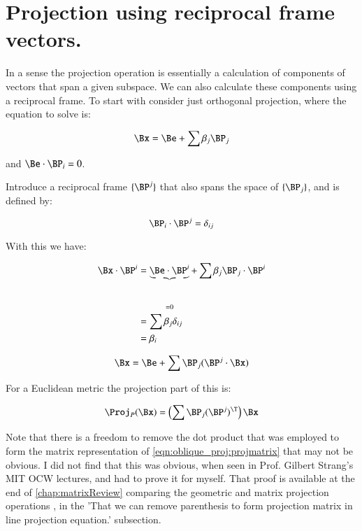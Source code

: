 \section{Projection using reciprocal frame vectors. }


In a sense the projection operation is essentially a calculation of components of vectors that span a given subspace.  We can also calculate these components using a reciprocal frame.  To start with consider
just orthogonal projection, where the equation to solve is:

\begin{equation}
\Bx = \Be + \sum \beta_j \BP_j
\end{equation}

and $\Be \cdot \BP_i = 0$.

Introduce a reciprocal frame $\{\BP^j\}$ that also spans the space of $\{\BP_j\}$, and is defined by:

\[
\BP_i \cdot \BP^j = \delta_{ij}
\]

With this we have:

\begin{align*}
\Bx \cdot \BP^i
&= \underbrace{\Be \cdot \BP^i}_{=0} + \sum \beta_j \BP_j \cdot \BP^i \\
&= \sum \beta_j \delta_{ij} \\
&= \beta_i \\
\end{align*}

\begin{equation*}
\Bx = \Be + \sum \BP_j (\BP^j \cdot \Bx)
\end{equation*}

For a Euclidean metric the projection part of this is:

\begin{equation}\label{eqn:oblique_proj:projmatrix}
\Proj_P(\Bx) = \left( \sum \BP_j (\BP^j)^\T \right) \Bx
\end{equation}

Note that there is a freedom to remove the dot product that was employed
to form the matrix representation of \ref{eqn:oblique_proj:projmatrix} that may not be obvious.
I did not find that this 
was obvious, when seen in Prof. Gilbert Strang's MIT OCW lectures, and 
had to prove it for myself.  That proof is available at the end of 
\ref{chap:matrixReview}
comparing the geometric and matrix projection operations 
, in the 'That we can remove parenthesis to form projection matrix in line projection equation.' subsection.

